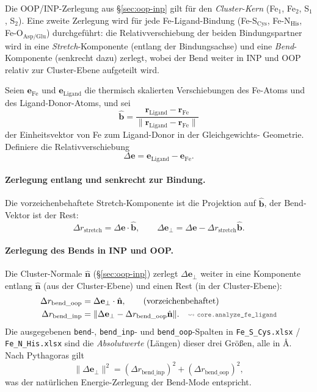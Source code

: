 \documentclass[11pt,a4paper,twoside]{article}
\newcommand{\evec}{\mathbf{e}}
\newcommand{\rvec}{\mathbf{r}}
\newcommand{\codref}[1]{%
  \quad\text{\textcolor{gray!70!black}{\footnotesize $\rightsquigarrow$~\texttt{#1}}}}
\theoremstyle{remark}
\begin{document}
Die OOP/INP-Zerlegung aus \S\ref{sec:oop-inp} gilt f\"ur den
\emph{Cluster-Kern} (Fe$_1$, Fe$_2$, S$_1$, S$_2$). Eine zweite
Zerlegung wird f\"ur jede Fe-Ligand-Bindung
(Fe-S$_\text{Cys}$, Fe-N$_\text{His}$, Fe-O$_\text{Asp/Glu}$)
durchgef\"uhrt: die Relativ\-verschiebung der beiden Bindungspartner
wird in eine \emph{Stretch}-Komponente (entlang der Bindungsachse)
und eine \emph{Bend}-Komponente (senkrecht dazu) zerlegt, wobei der
Bend weiter in INP und OOP relativ zur Cluster-Ebene aufgeteilt wird.

Seien $\evec_\text{Fe}$ und $\evec_\text{Ligand}$ die thermisch
skalierten Verschiebungen des Fe-Atoms und des Ligand-Donor-Atoms,
und sei
\begin{equation}
  \hat{\mathbf{b}} = \frac{\rvec_\text{Ligand} - \rvec_\text{Fe}}
                            {\lVert\rvec_\text{Ligand} - \rvec_\text{Fe}\rVert}
\end{equation}
der Einheitsvektor von Fe zum Ligand-Donor in der Gleichgewichts-
Geometrie. Definiere die Relativ\-verschiebung
\begin{equation}
  \Delta\evec = \evec_\text{Ligand} - \evec_\text{Fe}.
  \label{eq:fe-lig-delta}
\end{equation}

\paragraph{Zerlegung entlang und senkrecht zur Bindung.}
Die vorzeichenbehaftete Stretch-Komponente ist die Projektion auf
$\hat{\mathbf{b}}$, der Bend-Vektor ist der Rest:
\begin{equation}
  \Delta r_\text{stretch} = \Delta\evec \cdot \hat{\mathbf{b}},
  \qquad
  \Delta\evec_\perp = \Delta\evec
                       - \Delta r_\text{stretch}\hat{\mathbf{b}}.
  \label{eq:fe-lig-perp}
\end{equation}

\paragraph{Zerlegung des Bends in INP und OOP.}
Die Cluster-Normale $\hat{\mathbf{n}}$ (\S\ref{sec:oop-inp}) zerlegt
$\Delta\evec_\perp$ weiter in eine Komponente entlang $\hat{\mathbf{n}}$
(aus der Cluster-Ebene) und einen Rest (in der Cluster-Ebene):
\begin{align}
  \Delta r_\text{bend\_oop} &= \Delta\evec_\perp \cdot \hat{\mathbf{n}},
  \qquad\text{(vorzeichenbehaftet)} \\
  \Delta r_\text{bend\_inp} &= \lVert\Delta\evec_\perp
       - \Delta r_\text{bend\_oop}\hat{\mathbf{n}}\rVert.
  \codref{core.analyze\_fe\_ligand}
  \label{eq:fe-lig-bend-split}
\end{align}
Die ausgegebenen \texttt{bend}-, \texttt{bend\_inp}- und
\texttt{bend\_oop}-Spalten in \texttt{Fe\_S\_Cys.xlsx} /
\texttt{Fe\_N\_His.xlsx} sind die \emph{Absolutwerte} (L\"angen)
dieser drei Gr\"o\ss en, alle in \AA{}. Nach Pythagoras gilt
\begin{equation}
  \lVert\Delta\evec_\perp\rVert^2
    = (\Delta r_\text{bend\_inp})^2 + (\Delta r_\text{bend\_oop})^2,
\end{equation}
was der nat\"urlichen Energie-Zerlegung der Bend-Mode entspricht.
\end{document}
